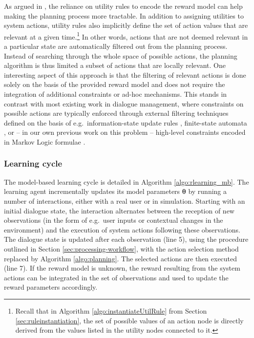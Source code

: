 As argued in \cite{onlineplanning-iwsds2012}, the reliance on utility rules to encode the reward model can help making the planning process more tractable.  In addition to assigning utilities to system actions, utility rules also implicitly define the set of action values that are relevant at a given time.\footnote{Recall that in Algorithm \ref{algo:instantiateUtilRule} from Section \ref{sec:ruleinstantiation}, the set of possible values of an action node is directly derived from the values listed in the utility nodes connected to it.} In other words, actions that are not deemed relevant in a particular state are automatically filtered out from the planning process.  Instead of searching through the whole space of possible actions, the planning algorithm is thus limited a subset of actions that are locally relevant.  One interesting aspect of this approach is that the filtering of relevant actions is done solely on the basis of the provided reward model and does not require the integration of additional constraints or ad-hoc mechanisms. This stands in contrast with most existing work in dialogue management, where constraints on possible actions are typically enforced through external filtering techniques defined on the basis of e.g.\ information-state update rules \citep{heeman2007}, finite-state automata \citep{williams2008}, or -- in our own previous work on this problem -- high-level constraints encoded in Markov Logic formulae \citep{srw-acl2010}. 

 
\subsubsection*{Learning cycle}

The model-based learning cycle is detailed in Algorithm \ref{algo:rlearning_mb}. The learning agent incrementally updates its model parameters $\boldsymbol\theta$  by running a number of interactions, either with a real user or in simulation. Starting with an initial dialogue state, the interaction alternates between the reception of new observations (in the form of e.g.\ user inputs or contextual changes in the environment) and the execution of system actions following these observations.  The dialogue state is updated after each observation (line 5), using the procedure outlined in Section \ref{sec:processing-workflow}, with the action selection method replaced by Algorithm \ref{algo:planning}. The selected actions are then executed (line 7).   If the reward model is unknown, the reward resulting from the system actions can be integrated in the set of observations and used to update the reward parameters accordingly. 


